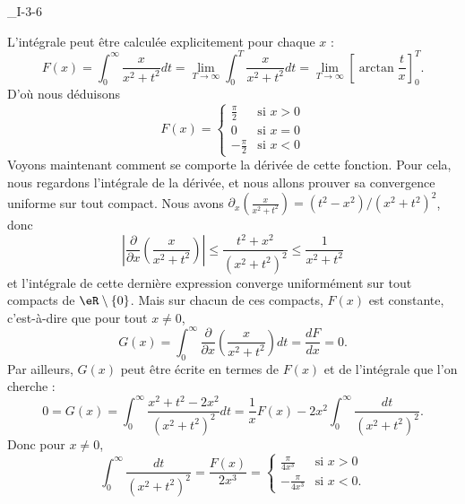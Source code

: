 

\begin{corrige}{_I-3-6}

L'intégrale peut être calculée explicitement pour chaque $x$ :
\begin{equation}
	F(x)=\int_0^{\infty}\frac{ x }{ x^2+t^2 }dt=\lim_{T\to\infty}\int_0^{T}\frac{ x }{ x^2+t^2 }dt=\lim_{T\to\infty}\left[ \arctan\frac{ t }{ x } \right]_0^T.
\end{equation}
D'où nous déduisons
\begin{equation}
	F(x)=\begin{cases}
	\frac{ \pi }{ 2 }	&	\text{si }x>0\\
	0			&	\text{si }x=0\\
	-\frac{ \pi }{2}	&	\text{si }x<0
\end{cases}
\end{equation}
Voyons maintenant comment se comporte la dérivée de cette fonction. Pour cela, nous regardons l'intégrale de la dérivée, et nous allons prouver sa convergence uniforme sur tout compact. Nous avons $\partial_x\left(\frac{ x }{ x^2+t^2 }\right)=(t^2-x^2)/(x^2+t^2)^2$, donc
\begin{equation}
	\left| \frac{ \partial  }{ \partial x }\left(\frac{ x }{ x^2+t^2 }\right) \right| \leq \frac{ t^2+x^2 }{ (x^2+t^2)^2 }\leq \frac{1}{ x^2+t^2 }
\end{equation}
et l'intégrale de cette dernière expression converge uniformément sur tout compacts de $\eR\setminus\{ 0 \}$. Mais sur chacun de ces compacts, $F(x)$ est constante, c'est-à-dire que pour tout $x\neq 0$,
\begin{equation}
	G(x)=\int_0^{\infty}\frac{ \partial  }{ \partial x }\left( \frac{ x }{ x^2+t^2 } \right)dt=\frac{ dF }{ dx }=0.
\end{equation}
Par ailleurs, $G(x)$ peut être écrite en termes de $F(x)$ et de l'intégrale que l'on cherche :
\begin{equation}
	0=G(x)=\int_0^{\infty}\frac{ x^2+t^2-2x^2 }{ (x^2+t^2)^2 }dt=\frac{1}{ x }F(x)-2x^2\int_0^{\infty}\frac{ dt }{ (x^2+t^2)^2 }.
\end{equation}
Donc pour $x\neq 0$,
\begin{equation}
	\int_0^{\infty}\frac{ dt }{ (x^2+t^2)^2 }=\frac{ F(x) }{ 2x^3 }=\begin{cases}
	\frac{ \pi }{ 4x^3 }	&	\text{si }x>0\\
	-\frac{ \pi }{ 4x^3 }	&	 \text{si }x<0.
\end{cases}
\end{equation}

\end{corrige}
